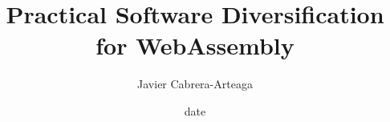 
\title{ Practical Software Diversification for WebAssembly }
\author{Javier Cabrera-Arteaga }
\date{date}


\address{KTH Royal Institute of Technology \\School of Electrical Engineering and Computer Science\\ Division of Software and Computer Systems \\ SE-10044 Stockholm\\ Sweden}
